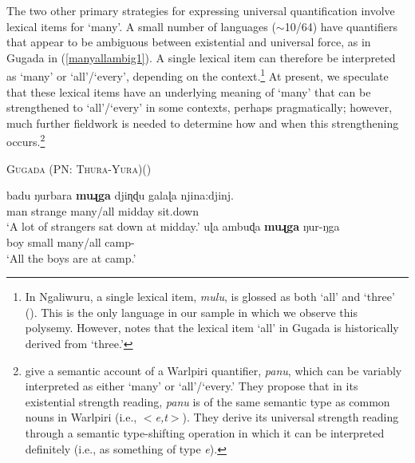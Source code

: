 \documentclass[12pt,egregdoesnotlikesansseriftitles]{scrartcl}
\begin{document}
The two other primary strategies for expressing universal quantification  involve lexical items for `many'. A small number of languages ($\sim$10/64) have quantifiers that appear to be ambiguous between existential and universal force, as in Gugada \textit{} in  (\ref{manyallambig1}). A single lexical item can therefore be interpreted as `many' or `all'/`every', depending on the context.\footnote{In Ngaliwuru, a single lexical item, \textit{mulu}, is glossed as both `all' and `three' (\citealt[77]{boltetal71}). This is the only language in our sample in which we observe this polysemy. However, \cite{platt72} notes that the lexical item \textit{{}} `all' in Gugada is historically derived from `three.'} At present, we speculate that these lexical items have an underlying meaning of `many' that can be strengthened to `all'/`every' in some contexts, perhaps pragmatically; however, much further fieldwork is needed to determine how and when this strengthening occurs.\footnote{\cite{bittnerhale95} give a semantic account of a Warlpiri quantifier, \textit{panu}, which can be variably interpreted as either `many' or `all'/`every.' They propose that in its existential strength reading, \textit{panu} is of the same semantic type as common nouns in Warlpiri (i.e., $<$\textit{e,t}$>$). They derive its universal strength reading through a semantic type-shifting operation in which it can be interpreted definitely (i.e., as something of type \textit{e}).} %

\begin{exe}
  \ex\label{manyallambig1}\textsc{Gugada (PN: Thura-Yura)}\hfill (\citealt[56--65]{platt72})
  \begin{xlist}
    \ex \gll badu ŋurbara \textbf{muɻga} {djiɳɖu galaɭa} njina:djinj.\\
    man  strange  many/all  midday         sit.down\\
    \glt `A lot of strangers sat down at midday.'
    \ex \gll uɭa ambuɖa \textbf{muɻga} ŋur-ŋga\\
    boy   small    many/all      camp-\Loc\\
    \glt `All the boys are at camp.'%
  \end{xlist}
 \end{exe}
 
\end{document}
